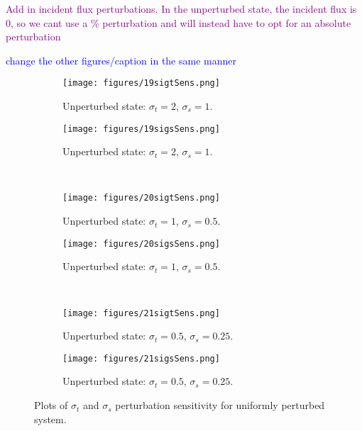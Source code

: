 \documentclass{article}
\newcommand{\sigt}{\sigma_t}
\newcommand{\sigs}{\sigma_s}
\newcommand{\comment}[2]{\marginpar{\textcolor{#2}{$\star$}}\textcolor{#2}{#1}\newline}
\newcommand{\jcr}[1]{\comment{#1}{blue}}
\newcommand{\todo}[1]{\comment{#1}{purple}}
\newcommand{\jcr}[1]{\phantom{a}}
\newcommand{\todo}[1]{\phantom{a}}
\begin{document}
\todo{Add in incident flux perturbations. In the unperturbed state, the incident flux is 0, so we cant use a \% perturbation and will instead have to opt for an absolute perturbation}

\jcr{change the other figures/caption in the same manner}

\begin{figure}[H]
\label{HomoPerts}
\centering
\begin{subfigure}{.5\textwidth}
  \centering
  \texttt{[image: figures/19sigtSens.png]}
  \caption{Unperturbed state: $\sigt=2$, $\sigs=1$.}
  \label{fig:sfig1}
\end{subfigure}%
\begin{subfigure}{.5\textwidth}
  \centering
  \texttt{[image: figures/19sigsSens.png]}
  \caption{Unperturbed state: $\sigt=2$, $\sigs=1$.}
  \label{fig:sfig4}
\end{subfigure}%
\\
\begin{subfigure}{.5\textwidth}
  \centering
  \texttt{[image: figures/20sigtSens.png]}
  \caption{Unperturbed state: $\sigt=1$, $\sigs=0.5$.}
  \label{fig:sfig2}
\end{subfigure}%
\begin{subfigure}{.5\textwidth}
  \centering
  \texttt{[image: figures/20sigsSens.png]}
  \caption{Unperturbed state: $\sigt=1$, $\sigs=0.5$.}
  \label{fig:sfig5}
\end{subfigure}%
\\
\begin{subfigure}{.5\textwidth}
  \centering
  \texttt{[image: figures/21sigtSens.png]}
  \caption{Unperturbed state: $\sigt=0.5$, $\sigs=0.25$.}
  \label{fig:sfig3}
\end{subfigure}%
\begin{subfigure}{.5\textwidth}
  \centering
  \texttt{[image: figures/21sigsSens.png]}
  \caption{Unperturbed state: $\sigt=0.5$, $\sigs=0.25$.}
  \label{fig:sfig6}
\end{subfigure}%
\caption{Plots of $\sigt$ and $\sigs$ perturbation sensitivity for uniformly perturbed system.}
\label{fig:fig}
\end{figure}
\end{document}
